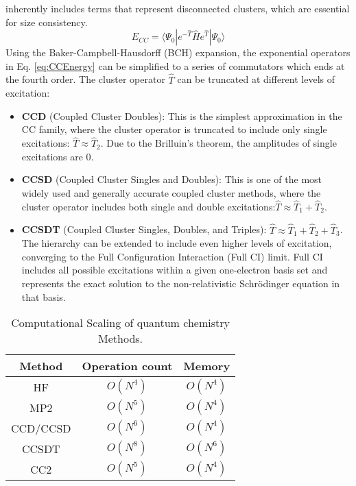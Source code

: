 inherently includes terms that represent disconnected clusters, which are essential for size consistency. \fi
\begin{equation}\label{eq:CCEnergy}
    E_{CC}=\langle \Psi_{0} | e^{-\hat{T}} \hat{H} e^{\hat{T}} | \Psi_{0} \rangle
\end{equation}
Using the Baker-Campbell-Hausdorff (BCH) expansion, the exponential operators in Eq. \ref{eq:CCEnergy} can be simplified to a series of commutators which ends at the fourth order. The cluster operator $\hat{T}$ can be truncated at different levels of excitation:
\begin{itemize}
    \item \textbf{CCD} (Coupled Cluster Doubles): This is the simplest approximation in the CC family, where the cluster operator is truncated to include only single excitations: $\hat{T} \approx \hat{T}_2$. Due to the Brilluin's theorem, the amplitudes of single excitations are 0. 
    \item \textbf{CCSD} (Coupled Cluster Singles and Doubles): This is one of the most widely used and generally accurate coupled cluster methods, where the cluster operator includes both single and double excitations:$\hat{T} \approx \hat{T}_1 + \hat{T}_2$.
    \item \textbf{CCSDT} (Coupled Cluster Singles, Doubles, and Triples): $\hat{T} \approx \hat{T}_1 + \hat{T}_2 + \hat{T}_3$.
    The hierarchy can be extended to include even higher levels of excitation, converging to the Full Configuration Interaction (Full CI) limit. Full CI includes all possible excitations within a given one-electron basis set and represents the exact solution to the non-relativistic Schrödinger equation in that basis.
\end{itemize}
\begin{table}[h!]
    \centering
    \begin{tabular}{ccc}
        Method & Operation count & Memory \\
        \hline
        HF & $O(N^4)$ & $O(N^4)$ \\
        MP2 & $O(N^5)$ & $O(N^4)$ \\
        CCD/CCSD & $O(N^6)$ & $O(N^4)$ \\
        CCSDT & $O(N^8)$ & $O(N^6)$ \\
        CC2 & $O(N^{5})$ & $O(N^4)$ \\
    \end{tabular}
    \caption{Computational Scaling of quantum chemistry Methods.}
    \label{tab:qc_scaling}
\end{table}

